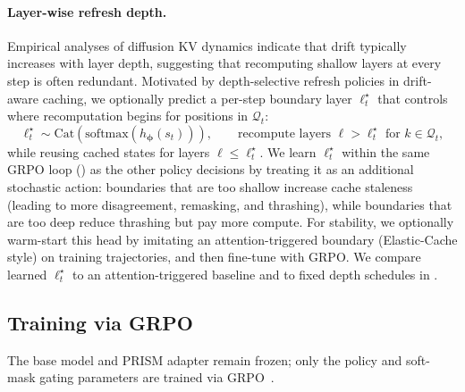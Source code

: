 \documentclass[11pt]{article}
\newcommand{\cQ}{\mathcal{Q}}
\newcommand{\bphi}{\bm{\phi}}
\begin{document}
\paragraph{Layer-wise refresh depth.}
Empirical analyses of diffusion KV dynamics indicate that drift typically increases
with layer depth, suggesting that recomputing shallow layers at every step is often redundant.
Motivated by depth-selective refresh policies in drift-aware caching, we optionally predict a per-step
boundary layer $\ell_t^\star$ that controls where recomputation begins for positions in $\cQ_t$:
\begin{equation}
    \ell_t^\star \sim \text{Cat}\!\left(\text{softmax}(h_{\bphi}(s_t))\right),
    \qquad
    \text{recompute layers } \ell > \ell_t^\star \text{ for } k \in \cQ_t,
    \label{eq:learned_boundary_layer}
\end{equation}
while reusing cached states for layers $\ell \le \ell_t^\star$. We learn $\ell_t^\star$ within the same GRPO
loop () as the other policy decisions by treating it as an additional stochastic action: boundaries that are
too shallow increase cache staleness (leading to more disagreement, remasking, and thrashing),
while boundaries that are too deep reduce thrashing but pay more compute. For stability, we optionally
warm-start this head by imitating an attention-triggered boundary (Elastic-Cache style) on training
trajectories, and then fine-tune with GRPO. We compare learned $\ell_t^\star$ to an attention-triggered
baseline and to fixed depth schedules in .

\subsection{Training via GRPO}
\label{sec:optimization}

The base model and PRISM adapter remain frozen; only the policy and soft-mask gating parameters are trained via GRPO~\cite{shao2024deepseekmath}.
\end{document}
